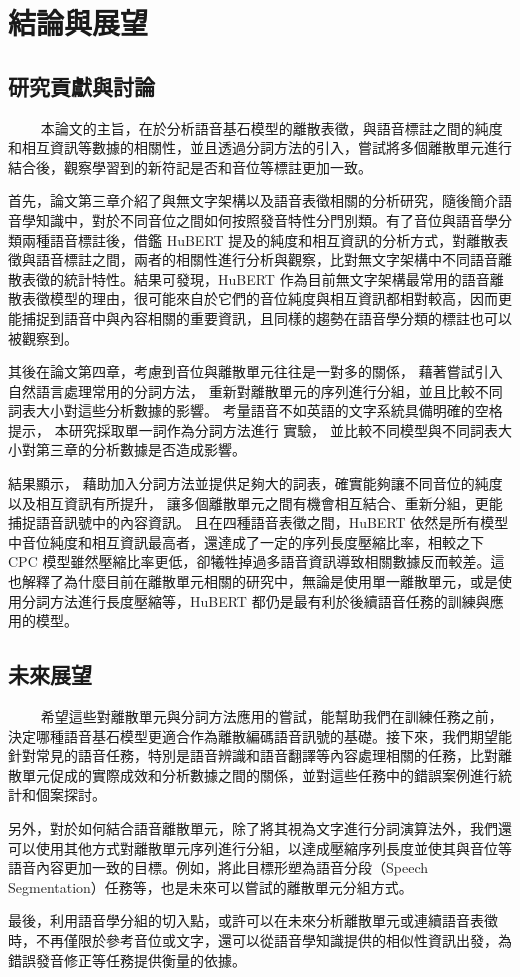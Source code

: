 \chapter{結論與展望}

\section{研究貢獻與討論}
　　
本論文的主旨，在於分析語音基石模型的離散表徵，與語音標註之間的純度和相互資訊等數據的相關性，並且透過分詞方法的引入，嘗試將多個離散單元進行結合後，觀察學習到的新符記是否和音位等標註更加一致。 

首先，論文第三章介紹了與無文字架構以及語音表徵相關的分析研究，隨後簡介語音學知識中，對於不同音位之間如何按照發音特性分門別類。有了音位與語音學分類兩種語音標註後，借鑑 HuBERT 提及的純度和相互資訊的分析方式，對離散表徵與語音標註之間，兩者的相關性進行分析與觀察，比對無文字架構中不同語音離散表徵的統計特性。結果可發現，HuBERT 作為目前無文字架構最常用的語音離散表徵模型的理由，很可能來自於它們的音位純度與相互資訊都相對較高，因而更能捕捉到語音中與內容相關的重要資訊，且同樣的趨勢在語音學分類的標註也可以被觀察到。

其後在論文第四章，考慮到音位與離散單元往往是一對多的關係，
藉著嘗試引入自然語言處理常用的分詞方法，
重新對離散單元的序列進行分組，並且比較不同詞表大小對這些分析數據的影響。
考量語音不如英語的文字系統具備明確的空格提示，
本研究採取單一詞作為分詞方法進行
實驗，
並比較不同模型與不同詞表大小對第三章的分析數據是否造成影響。

結果顯示，
藉助加入分詞方法並提供足夠大的詞表，確實能夠讓不同音位的純度以及相互資訊有所提升，
讓多個離散單元之間有機會相互結合、重新分組，更能捕捉語音訊號中的內容資訊。
且在四種語音表徵之間，HuBERT 依然是所有模型中音位純度和相互資訊最高者，還達成了一定的序列長度壓縮比率，相較之下 CPC 模型雖然壓縮比率更低，卻犧牲掉過多語音資訊導致相關數據反而較差。這也解釋了為什麼目前在離散單元相關的研究中，無論是使用單一離散單元，或是使用分詞方法進行長度壓縮等，HuBERT 都仍是最有利於後續語音任務的訓練與應用的模型。

 

\section{未來展望}
　　
希望這些對離散單元與分詞方法應用的嘗試，能幫助我們在訓練任務之前，決定哪種語音基石模型更適合作為離散編碼語音訊號的基礎。接下來，我們期望能針對常見的語音任務，特別是語音辨識和語音翻譯等內容處理相關的任務，比對離散單元促成的實際成效和分析數據之間的關係，並對這些任務中的錯誤案例進行統計和個案探討。

另外，對於如何結合語音離散單元，除了將其視為文字進行分詞演算法外，我們還可以使用其他方式對離散單元序列進行分組，以達成壓縮序列長度並使其與音位等語音內容更加一致的目標。例如，將此目標形塑為語音分段（Speech Segmentation）任務等，也是未來可以嘗試的離散單元分組方式。

最後，利用語音學分組的切入點，或許可以在未來分析離散單元或連續語音表徵時，不再僅限於參考音位或文字，還可以從語音學知識提供的相似性資訊出發，為錯誤發音修正等任務提供衡量的依據。
